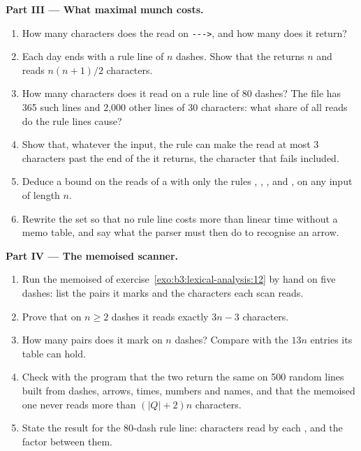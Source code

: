 \begin{problem}
\medskip\noindent\textbf{Part III --- What maximal munch costs.}
\begin{enumerate}[resume]
\item How many characters does the  read on \texttt{-{}-{}-{}>}, and how many  does it return?
\item Each day ends with a rule line of $n$ dashes. Show that the  returns $n$   and reads $n(n+1)/2$ characters.
\item How many characters does it read on a rule line of 80 dashes? The file has 365 such lines and 2,000 other lines of 30 characters: what share of all reads do the rule lines cause?
\item Show that, whatever the input, the  rule can make the  read at most 3 characters past the end of the  it returns, the character that fails included.
\item Deduce a bound on the reads of a  with only the rules , , ,  and , on any input of length $n$.
\item Rewrite the  set so that no rule line costs more than linear time without a memo table, and say what the parser must then do to recognise an arrow.
\end{enumerate}

\medskip\noindent\textbf{Part IV --- The memoised scanner.}
\begin{enumerate}[resume]
\item Run the memoised  of exercise~\ref{exo:b3:lexical-analysis:12} by hand on five dashes: list the pairs it marks and the characters each scan reads.
\item Prove that on $n \ge 2$ dashes it reads exactly $3n - 3$ characters.
\item How many pairs does it mark on $n$ dashes? Compare with the $13n$ entries its table can hold.
\item Check with the program that the two  return the same  on 500 random lines built from dashes, arrows, times, numbers and names, and that the memoised one never reads more than $(|Q| + 2)n$ characters.
\item State the result for the 80-dash rule line: characters read by each , and the factor between them.
\end{enumerate}
\end{problem}
